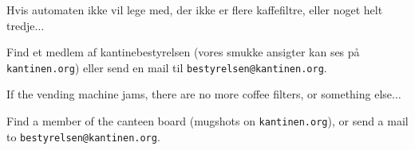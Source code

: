 \documentclass{article}
\begin{document}
\maketitle

\vspace{-0.5cm}


\vspace{-1.2cm}

\begin{center}

\LARGE

Hvis automaten ikke vil lege med, der ikke er flere kaffefiltre, eller noget
helt tredje$\ldots$\\

\Huge

Find et medlem af kantinebestyrelsen (vores smukke ansigter kan ses på
\texttt{kantinen.org}) eller send en mail til \texttt{bestyrelsen@kantinen.org}.

\end{center}

\english

\vspace{-0.3cm}


\vspace{-1.2cm}

\begin{center}

\LARGE

If the vending machine jams, there are no more coffee filters, or something
else$\ldots$\\

\Huge

Find a member of the canteen board (mugshots on \texttt{kantinen.org}), or
send a mail to \texttt{bestyrelsen@kantinen.org}.

\end{center}

\dansk

\underskriv
\end{document}
